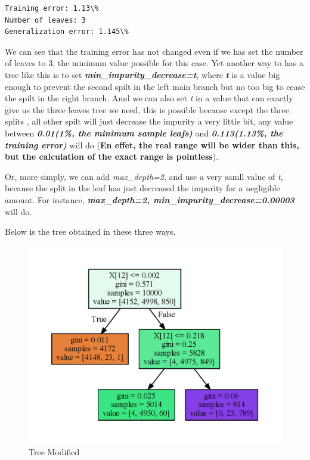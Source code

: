 \documentclass[11pt]{article}
\makeatletter
\def\maxwidth{\ifdim\Gin@nat@width>\linewidth\linewidth
    \else\Gin@nat@width\fi}
\let\Oldincludegraphics\includegraphics
\renewcommand{\includegraphics}[1]{\Oldincludegraphics[width=.8\maxwidth]{#1}}
\makeatother
\begin{document}
    \begin{Verbatim}[commandchars=\\\{\}]
Training error: 1.13\%
Number of leaves: 3
Generalization error: 1.145\%

    \end{Verbatim}

    We can see that the training error has not changed even if we has set
the number of leaves to 3, the minimum value possible for this case. Yet
another way to has a tree like this is to set
\textbf{\emph{min\_impurity\_decrease=t}}, where \textbf{\emph{t}} is a
value big enough to prevent the second spilt in the left main branch but
no too big to cease the spilt in the right branch. Amd we can also set
\emph{t} in a value that can exactly give us the three leaves tree we
need, this is possible because except the three splits , all other spilt
will just decrease the impurity a very little bit, any value between
\textbf{\emph{0.01(1\%, the minimum sample leafs)}} and
\textbf{\emph{0.113(1.13\%, the training error)}} will do (\textbf{En
effet, the real range will be wider than this, but the calculation of
the exact range is pointless}).

Or, more simply, we can add \emph{max\_depth=2}, and use a very samll
value of \emph{t}, because the split in the leaf has just decreased the
impurity for a negligible amount. For instance,
\textbf{\emph{max\_depth=2, min\_impurity\_decrease=0.00003}} will do.

Below is the tree obtained in these three ways.

    \begin{figure}
\centering
\includegraphics{img/Tree_modified.png}
\caption{Tree Modified}
\end{figure}
\end{document}
